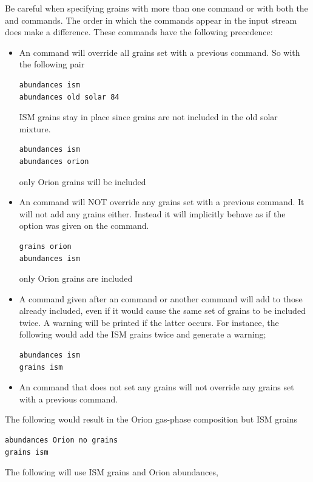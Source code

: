 Be careful when specifying grains with more than one
 command or
with both the  and  commands.
The order in which the
commands appear in the input stream does make a difference.
These commands
have the following precedence:

\begin{itemize}
\item An  command will override all grains set with a previous
 command.  So with the following pair
\begin{verbatim}
abundances ism
abundances old solar 84
\end{verbatim}
ISM grains stay in place since grains are not included in the
old solar mixture.
\begin{verbatim}
abundances ism
abundances orion
\end{verbatim}
only Orion grains will be included

\item An  command will NOT override any grains set
with a previous  command.
It will not add any grains either.
Instead it will implicitly behave as if the option
was given on the  command.
\begin{verbatim}
grains orion
abundances ism
\end{verbatim}
only Orion grains are included

\item A  command given after an
command or another 
command will add to those already included,
even if it would cause the same
set of grains to be included twice.
A warning will be printed if the latter occurs.
For instance, the following would add the ISM grains twice and
generate a warning;
\begin{verbatim}
abundances ism
grains ism
\end{verbatim}
\item An  command that does not set
any grains will not override any
grains set with a previous  command.
\end{itemize}
The following would result in the Orion gas-phase composition but ISM grains
\begin{verbatim}
abundances Orion no grains
grains ism
\end{verbatim}
The following will use ISM grains and Orion abundances,
